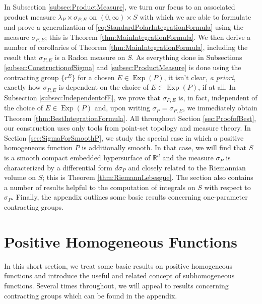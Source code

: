 \documentclass[11pt]{article}
\theoremstyle{remark}
\newcommand\Exp{\operatorname{Exp}}
\begin{document}
\noindent In Subsection \ref{subsec:ProductMeasure}, we turn our focus to an associated product measure $\lambda_P\times\sigma_{P,E}$ on $(0,\infty)\times S$ with which we are able to formulate and prove a generalization of \eqref{eq:StandardPolarIntegrationFormula} using the measure $\sigma_{P,E}$; this is Theorem \ref{thm:MainIntegrationFormula}. We then derive a number of corollaries of Theorem \ref{thm:MainIntegrationFormula}, including the result that $\sigma_{P,E}$ is a Radon measure on $S$. As everything done in Subsections \ref{subsec:ConstructionofSigma} and \ref{subsec:ProductMeasure} is done using the contracting group $\{r^E\}$ for a chosen $E\in\Exp(P)$, it isn't clear, \textit{a priori}, exactly how $\sigma_{P,E}$ is dependent on the choice of $E\in\Exp(P)$, if at all. In Subsection \ref{subsec:IndependentofE}, we prove that $\sigma_{P,E}$ is, in fact, independent of the choice of $E\in \Exp(P)$ and, upon writing $\sigma_P=\sigma_{P,E}$, we immediately obtain Theorem \ref{thm:BestIntegrationFormula}. All throughout Section \ref{sec:ProofofBest}, our construction uses only tools from point-set topology and measure theory.  In Section \ref{sec:SigmaForSmoothP}, we study the special case in which a positive homogeneous function $P$ is additionally smooth. In that case, we will find that $S$ is a smooth compact embedded hypersurface of $\mathbb{R}^d$ and the measure $\sigma_P$ is characterized by a differential form $d\sigma_P$ and closely related to the Riemannian volume on $S$; this is Theorem \ref{thm:RiemannLebesgue}. The section also contains a number of results helpful to the computation of integrals on $S$ with respect to $\sigma_P$. Finally, the appendix outlines some basic results concerning one-parameter contracting groups.  





\section{Positive Homogeneous Functions}\label{sec:Homogeneous}

In this short section, we treat some basic results on positive homogeneous functions and introduce the useful and related concept of subhomogeneous functions. Several times throughout, we will appeal to results concerning contracting groups which can be found in the appendix.
\end{document}
